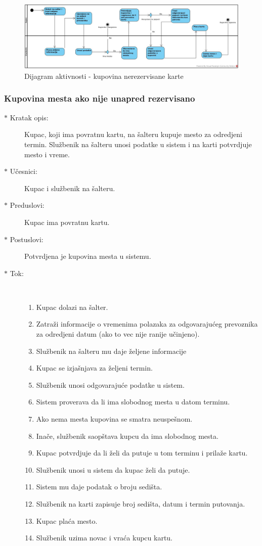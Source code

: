 \begin{figure}[!htb] 
	\centering
	\includegraphics[width=1.2\linewidth]{"../Slike/kupovina"}
	\caption{Dijagram aktivnosti - kupovina nerezervisane karte}
	\label{fig:kupovina}
\end{figure}

\subsubsection{Kupovina mesta ako nije unapred rezervisano}
\begin{description}
	\item[$\ast$ Kratak opis: ] Kupac, koji ima povratnu kartu, na \v salteru kupuje mesto za odredjeni termin. Slu\v zbenik na \v salteru unosi podatke u sistem i na karti potvrdjuje mesto i vreme.
	\item[$\ast$ U\v cesnici: ] Kupac i slu\v zbenik na \v salteru.
	\item[$\ast$ Preduslovi: ] Kupac ima povratnu kartu.
	\item[$\ast$ Postuslovi: ] Potvrdjena je kupovina mesta u sistemu.
	\item[$\ast$ Tok: ] \ \\
	\begin{enumerate}
		\item Kupac dolazi na \v salter.
		\item Zatra\v zi informacije o vremenima polazaka za odgovaraju\'ceg prevoznika za odredjeni datum (ako to vec nije ranije u\v cinjeno).
		\item Slu\v zbenik na \v salteru mu daje \v zeljene informacije
		\item Kupac se izja\v snjava za \v zeljeni termin.
		\item Slu\v zbenik unosi odgovaraju\'ce podatke u sistem.
		\item Sistem proverava da li ima slobodnog mesta u datom terminu.
		\item Ako nema mesta kupovina se smatra neuspe\v snom.
		\item Ina\v ce, slu\v zbenik saop\v stava kupcu da ima slobodnog mesta.
		\item Kupac potvrdjuje da li \v zeli da putuje u tom terminu i prila\v ze kartu.
		\item Slu\v zbenik unosi u sistem da kupac \v zeli da putuje.
		\item Sistem mu daje podatak o broju sedi\v sta.
		\item Slu\v zbenik na karti zapisuje broj sedi\v sta, datum i termin putovanja.
		\item Kupac pla\'ca mesto.
		\item Slu\v zbenik uzima novac i vra\'ca kupcu kartu.
	\end{enumerate}
\end{description}

